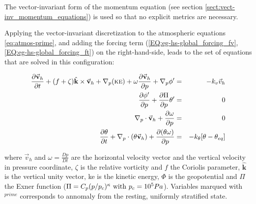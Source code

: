 The vector-invariant form of the momentum equation (see section
\ref{sect:vect-inv_momentum_equations}) is used so that no explicit 
metrics are necessary.

Applying the vector-invariant discretization to the
atmospheric equations \ref{eq:atmos-prime}, and adding the 
forcing term 
(\ref{EQ:eg-hs-global_forcing_fv}, \ref{EQ:eg-hs-global_forcing_ft})
on the right-hand-side,
leads to the set of equations that are solved in this configuration:


\begin{eqnarray}
\label{EQ:eg-hs-model_equations}
\frac{\partial \vec{\mathbf{v}}_h}{\partial t}
+(f + \zeta)\hat{\mathbf{k}} \times \vec{\mathbf{v}}_h
+\mathbf{\nabla }_{p} (\mbox{\sc ke})
+ \omega \frac{\partial \vec{\mathbf{v}}_h }{\partial p}
+\mathbf{\nabla }_p \phi ^{\prime } 
&=& 
-k_v\vec{v}_h
\\
\frac{\partial \phi ^{\prime }}{\partial p} 
+\frac{\partial \Pi }{\partial p}\theta ^{\prime } &=&0
\\
\mathbf{\nabla }_{p}\cdot \vec{\mathbf{v}}_h+\frac{\partial \omega }{
\partial p} &=&0
\\
\frac{\partial \theta }{\partial t} 
+ \mathbf{\nabla }_{p}\cdot (\theta \vec{\mathbf{v}}_h)
+ \frac{\partial (\theta \omega)}{\partial p}
&=& -k_{\theta}[\theta-\theta_{eq}]
\end{eqnarray}


\noindent where $\vec{v}_h$ and $\omega = \frac{Dp}{Dt}$ are the horizontal 
velocity vector and the vertical velocity in pressure coordinate,
$\zeta$ is the relative vorticity and $f$ the Coriolis parameter, 
$\hat{\mathbf{k}}$ is the vertical unity vector, 
{\sc ke} is the kinetic energy, $\Phi$ is the geopotential
and $\Pi$ the Exner function 
($\Pi = C_p (p/p_c)^\kappa ~{\rm with}~ p_c = 10^5 Pa$).
Variables marqued with $^{prime}$ corresponds to annomaly from 
the resting, uniformly stratified state.

